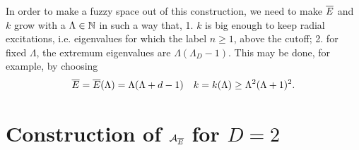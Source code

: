 In order to make a fuzzy space out of this construction, we need to make $\overline{E}$ and $k$ grow with a $\Lambda \in \mathbb{N}$ in such a way that, 1. $k$ is big enough to keep radial excitations, i.e. eigenvalues for which the label $n \geq 1$, above the cutoff; 2. for fixed $\Lambda$, the extremum eigenvalues are $\Lambda(\Lambda _ D - 1)$. This may be done, for example, by choosing 
\begin{align}
    \overline{E} = \overline{E}(\Lambda) &= \Lambda(\Lambda + d - 1) & k = k(\Lambda) \geq \Lambda^2(\Lambda + 1)^2.
\end{align}

\section{Construction of $\mathcal A_{\overline{E}}$ for $D = 2$}

